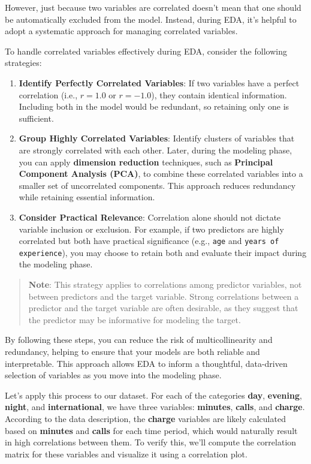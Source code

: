 \documentclass[
]{book}
\newcommand{\passthrough}[1]{#1}
\theoremstyle{definition}
\theoremstyle{definition}
\theoremstyle{definition}
\theoremstyle{definition}
\theoremstyle{remark}
\begin{document}
However, just because two variables are correlated doesn't mean that one should be automatically excluded from the model. Instead, during EDA, it's helpful to adopt a systematic approach for managing correlated variables.

To handle correlated variables effectively during EDA, consider the following strategies:

\begin{enumerate}
\def\labelenumi{\arabic{enumi}.}
\item
  \textbf{Identify Perfectly Correlated Variables}: If two variables have a perfect correlation (i.e., \(r = 1.0\) or \(r = -1.0\)), they contain identical information. Including both in the model would be redundant, so retaining only one is sufficient.
\item
  \textbf{Group Highly Correlated Variables}: Identify clusters of variables that are strongly correlated with each other. Later, during the modeling phase, you can apply \textbf{dimension reduction} techniques, such as \textbf{Principal Component Analysis (PCA)}, to combine these correlated variables into a smaller set of uncorrelated components. This approach reduces redundancy while retaining essential information.
\item
  \textbf{Consider Practical Relevance}: Correlation alone should not dictate variable inclusion or exclusion. For example, if two predictors are highly correlated but both have practical significance (e.g., \passthrough{\lstinline!age!} and \passthrough{\lstinline!years of experience!}), you may choose to retain both and evaluate their impact during the modeling phase.
\end{enumerate}

\begin{quote}
\textbf{Note}: This strategy applies to correlations among predictor variables, not between predictors and the target variable. Strong correlations between a predictor and the target variable are often desirable, as they suggest that the predictor may be informative for modeling the target.
\end{quote}

By following these steps, you can reduce the risk of multicollinearity and redundancy, helping to ensure that your models are both reliable and interpretable. This approach allows EDA to inform a thoughtful, data-driven selection of variables as you move into the modeling phase.

Let's apply this process to our dataset. For each of the categories \textbf{day}, \textbf{evening}, \textbf{night}, and \textbf{international}, we have three variables: \textbf{minutes}, \textbf{calls}, and \textbf{charge}. According to the data description, the \textbf{charge} variables are likely calculated based on \textbf{minutes} and \textbf{calls} for each time period, which would naturally result in high correlations between them. To verify this, we'll compute the correlation matrix for these variables and visualize it using a correlation plot.
\end{document}
